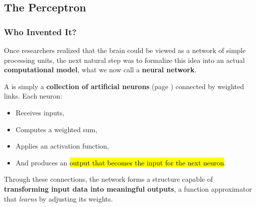 \subsection{The Perceptron}\label{sec:the-perceptron}

\subsubsection{Who Invented It?}

Once researchers realized that the brain could be viewed as a network of simple processing units, the next natural step was to formalize this idea into an actual \textbf{computational model}, what we now call a \textbf{neural network}.

\highspace
\begin{definitionbox}
    A  is simply a \textbf{collection of artificial neurons} (page \pageref{def:artificial-neuron}) connected by weighted links. Each neuron:
    \begin{itemize}
        \item Receives inputs,
        \item Computes a weighted sum,
        \item Applies an activation function,
        \item And produces an \hl{output that becomes the input for the next neuron}.
    \end{itemize}
    Through these connections, the network forms a structure capable of \textbf{transforming input data into meaningful outputs}, a function approximator that \emph{learns} by adjusting its weights.
\end{definitionbox}

